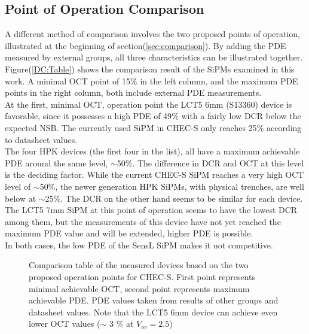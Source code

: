 \documentclass[12pt,article,type=msc,colorback,accentcolor=tud9c]{tudthesis}
\begin{document}
\subsection{Point of Operation Comparison}
\label{subsec:OP_comp}
A different method of comparison involves the two proposed points of operation, illustrated at the beginning of section(\ref{sec:comparison}). By adding the PDE measured by external groups, all three characteristics can be illustrated together. Figure(\ref{DC:Table}) shows the comparison result of the SiPMs examined in this work. A minimal OCT point of 15$\%$ in the left column, and the maximum PDE points in the right column, both include external PDE measurements.\\
At the first, minimal OCT, operation point the LCT5 6mm (S13360) device is favorable, since it possesses a high PDE of 49$\%$ with a fairly low DCR below the expected NSB. The currently used SiPM in CHEC-S only reaches 25$\%$ according to datasheet values.\\
The four HPK devices (the first four in the list), all have a maximum achievable PDE around the same level, $\sim$50$\%$. The difference in DCR and OCT at this level is the deciding factor. While the current CHEC-S SiPM reaches a very high OCT level of $\sim$50$\%$, the newer generation HPK SiPMs, with physical trenches, are well below at $\sim$25$\%$. The DCR on the other hand seems to be similar for each device. The LCT5 7mm SiPM at this point of operation seems to have the lowest DCR among them, but the measurements of this device have not yet reached the maximum PDE value and will be extended, higher PDE is possible.\\
In both cases, the low PDE of the SensL SiPM makes it not competitive.  



\begin{figure}[h]
\begin{centering}
\caption[Comparison based on two proposed points of operation]{Comparison table of the measured devices based on the two proposed operation points for CHEC-S. First point represents minimal achievable OCT, second point represents maximum achievable PDE. PDE values taken from results of other groups and datasheet values. Note that the LCT5 6mm device can achieve even lower OCT values ($\sim$ 3 $\%$ at $V_{ov}=2.5$)}
\label{fig:DC_Table}
\end{centering}
\end{figure}
\end{document}
